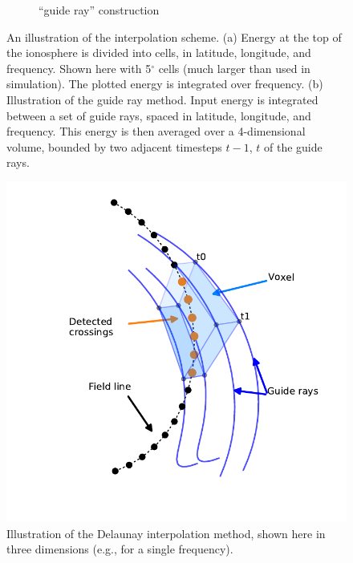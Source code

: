 \begin{figure}
\begin{subfigure}[t]{0.45\textwidth}
	\caption{``guide ray'' construction}
        \label{fig:guide_rays}
    \end{subfigure}
    \caption{An illustration of the interpolation scheme. (a) Energy at the top of the ionosphere is divided into cells, in latitude, longitude, and frequency. Shown here with 5$^\circ$ cells (much larger than used in simulation). The plotted energy is integrated over frequency. (b) Illustration of the guide ray method. Input energy is integrated between a set of guide rays, spaced in latitude, longitude, and frequency. This energy is then averaged over a 4-dimensional volume, bounded by two adjacent timesteps $t-1$, $t$ of the guide rays.}
    \label{fig:interpolation_scheme}
\end{figure}


\begin{figure}
\begin{center}
\includegraphics{figures/delaunay_1.pdf}
\caption{Illustration of the Delaunay interpolation method, shown here in three dimensions (e.g., for a single frequency).}
\label{fig:delaunay_1}
\end{center}
\end{figure}

